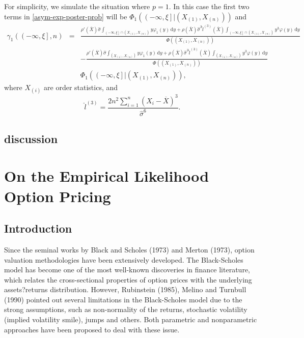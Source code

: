 \documentclass[oneside,english]{amsbook}
\numberwithin{section}{chapter}
\numberwithin{equation}{section}
\numberwithin{figure}{section}
\theoremstyle{plain}
\theoremstyle{plain}
\theoremstyle{definition}
\theoremstyle{plain}
\theoremstyle{plain}
\theoremstyle{remark}
\theoremstyle{definition}
\theoremstyle{definition}
\newcommand{\diff}{\,\mathrm{d}}
\begin{document}
For simplicity, we simulate the situation where $p=1$. In this case
the first two terms in \eqref{asym-exp-poster-prob} will be $\Phi_{1}\left(\left(-\infty,\xi\right]|\left(X_{\left(1\right)},X_{\left(n\right)}\right)\right)$
and 
\begin{eqnarray*}
\gamma_{1}\left(\left(-\infty,\xi\right],n\right) & = & \frac{\rho'\left(\overline{X}\right)\hat{\sigma}\int_{\left(-\infty,\xi\right]\cap\left(X_{\left(1\right)},X_{\left(n\right)}\right)}y\varphi_{1}\left(y\right)\diff y+\rho\left(\overline{X}\right)\hat{\sigma}^{3}\hat{l}^{\left(3\right)}\left(\overline{X}\right)\int_{\left(-\infty,\xi\right]\cap\left(X_{\left(1\right)},X_{\left(n\right)}\right)}y^{3}\varphi\left(y\right)\diff y}{\Phi\left(\left(X_{\left(1\right)},X_{\left(n\right)}\right)\right)}\\
 &  & -\frac{\rho'\left(\overline{X}\right)\hat{\sigma}\int_{\left(X_{\left(1\right)},X_{\left(n\right)}\right)}y\varphi_{1}\left(y\right)\diff y+\rho\left(\overline{X}\right)\hat{\sigma}^{3}\hat{l}^{\left(3\right)}\left(\overline{X}\right)\int_{\left(X_{\left(1\right)},X_{\left(n\right)}\right)}y^{3}\varphi\left(y\right)\diff y}{\Phi\left(\left(X_{\left(1\right)},X_{\left(n\right)}\right)\right)}\\
 &  & \Phi_{1}\left(\left(-\infty,\xi\right]|\left(X_{\left(1\right)},X_{\left(n\right)}\right)\right),
\end{eqnarray*}
where $X_{\left(i\right)}$ are order statistics, and 
\[
\hat{l}^{\left(3\right)}=\frac{2n^{2}\sum_{i=1}^{n}\left(X_{i}-\overline{X}\right)^{3}}{\hat{\sigma}^{6}}.
\]



\section{discussion\label{sec:discussion}}


\chapter{On the Empirical Likelihood Option Pricing}
\section{Introduction}
Since the seminal works by Black and Scholes (1973) and Merton (1973), option valuation methodologies have been extensively developed. The Black-Scholes model has become one of the most well-known discoveries in finance literature, which relates the cross-sectional properties of option prices with the underlying assets?returns distribution. However, Rubinstein (1985), Melino and Turnbull (1990) pointed out several limitations in the Black-Scholes model due to the strong assumptions, such as non-normality of the returns, stochastic volatility (implied volatility smile), jumps and others. Both parametric and nonparametric approaches have been proposed to deal with these issue.  
\end{document}
